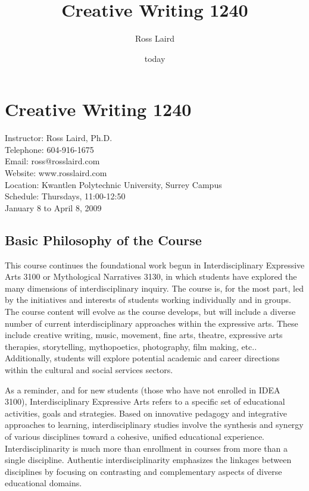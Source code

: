 \documentclass[letterpaper,10pt,headsepline]{scrreprt}
\author{Ross Laird}
\title{Creative Writing 1240}
\date{today}
\begin{document}
\section{Creative Writing 1240}
Instructor: Ross Laird, Ph.D.\\
Telephone: 604-916-1675\\
Email: ross@rosslaird.com\\
Website: www.rosslaird.com\\
Location: Kwantlen Polytechnic University, Surrey Campus\\
Schedule: Thursdays, 11:00-12:50\\
January 8 to April 8, 2009\\

\subsection{Basic Philosophy of the Course}

This course continues the foundational work begun in Interdisciplinary Expressive Arts 3100 or Mythological Narratives 3130, in which students have explored the many dimensions of interdisciplinary inquiry. The course is, for the most part, led by the initiatives and interests of students working individually and in groups. The course content will evolve as the course develops, but will include a diverse number of current interdisciplinary approaches within the expressive arts. These include creative writing, music, movement, fine arts, theatre, expressive arts therapies, storytelling, mythopoetics, photography, film making, etc.. Additionally, students will explore potential academic and career directions within the cultural and social services sectors.

As a reminder, and for new students (those who have not enrolled in IDEA 3100), Interdisciplinary Expressive Arts refers to a specific set of educational activities, goals and strategies. Based on innovative
pedagogy and integrative approaches to learning, interdisciplinary
studies involve the synthesis and synergy of various disciplines
toward a cohesive, unified educational experience. Interdisciplinarity
is much more than enrollment in courses from more than a single
discipline. Authentic interdisciplinarity emphasizes the linkages
between disciplines by focusing on contrasting and complementary
aspects of diverse educational domains.
\end{document}
